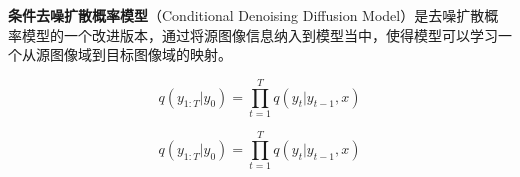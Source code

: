
\textbf{条件去噪扩散概率模型}（Conditional Denoising Diffusion Model）是去噪扩散概率模型的一个改进版本，通过将源图像信息纳入到模型当中，使得模型可以学习一个从源图像域到目标图像域的映射。

\begin{equation}
q({y_{1:T}}|{y_0}) = \prod\limits_{t = 1}^T {q({y_t}|{y_{t - 1},x})}
\end{equation}

\begin{equation}
q({y_{1:T}}|{y_0}) = \prod\limits_{t = 1}^T {q({y_t}|{y_{t - 1},x})}
\end{equation}